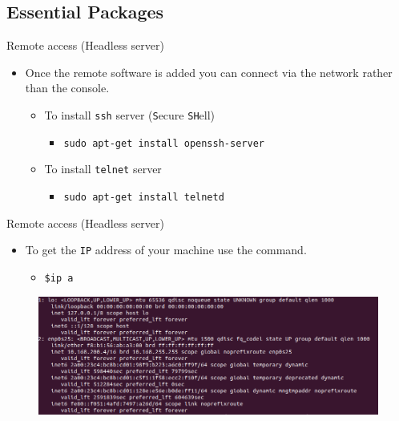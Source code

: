 \documentclass{beamer}
\begin{document}
\subsection{Essential Packages}
\begin{frame}{Remote access (Headless server)}
  \begin{itemize}
    \item Once the remote software is added you can connect via the network rather than the console.
      \begin{itemize}
        \item To install \texttt{ssh} server (\texttt{S}ecure \texttt{SH}ell)
          \begin{itemize}
            \item \texttt{sudo apt-get install openssh-server}
          \end{itemize}
        \item To install \texttt{telnet} server
          \begin{itemize}
            \item \texttt{sudo apt-get install telnetd}
          \end{itemize}
      \end{itemize}
  \end{itemize}
\end{frame}

\begin{frame}{Remote access (Headless server)}
  \begin{itemize}
    \item To get the \texttt{IP} address of your machine use the command.
      \begin{itemize}
        \item \texttt{\$ip a}
      \end{itemize}
  \end{itemize}
  \begin{figure}
    \begin{center}
      \includegraphics[width=1\linewidth]{ip.png}
    \end{center}
  \end{figure}
\end{frame}
\end{document}
